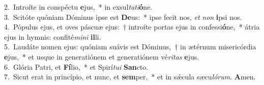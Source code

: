 {2.~}Introíte in conspéctu \textbf{e}jus,~* in exsul\textit{ta}\textit{ti}\textbf{ó}ne.\\
{3.~}Scitóte quóniam Dóminus ipse est \textbf{De}us:~* ipse fecit nos, \textit{et} \textit{non} \textbf{i}psi nos.\\
{4.~}Pópulus ejus, et oves páscuæ ejus:~† introíte portas ejus in confessi\textbf{ó}ne,~* átria ejus in hymnis: confité\textit{mi}\textit{ni} \textbf{il}li.\\
{5.~}Laudáte nomen ejus: quóniam suávis est Dóminus,~† in ætérnum misericórdia \textbf{e}jus,~* et usque in generatiónem et generatiónem vé\textit{ri}\textit{tas} \textbf{e}jus.\\
{6.~}Glória Patri, et \textbf{Fí}lio,~* et Spirí\textit{tu}\textit{i} \textbf{San}cto.\\
{7.~}Sicut erat in princípio, et nunc, et \textbf{sem}per,~* et in sǽcula sæcu\textit{ló}\textit{rum}. \textbf{A}men.\\
